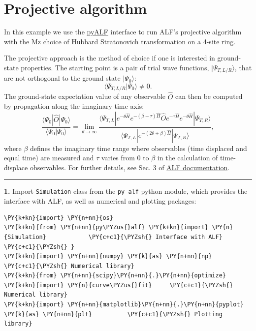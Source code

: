     
    

    
    \hypertarget{projective-algorithm}{%
\section{Projective algorithm}\label{projective-algorithm}}

    In this example we use the
\href{https://git.physik.uni-wuerzburg.de/ALF/pyALF/-/tree/ALF-2.2}{pyALF}
interface to run ALF's projective algorithm with the Mz choice of
Hubbard Stratonovich transformation on a 4-site ring.

The projective approach is the method of choice if one is interested in
ground-state properties. The starting point is a pair of trial wave
functions, \(|\Psi_{T,L/R} \rangle\), that are not orthogonal to the
ground state \(|\Psi_0 \rangle\): \[
  \langle \Psi_{T,L/R}  | \Psi_0 \rangle  \neq 0. 
\] The ground-state expectation value of any observable \(\hat{O}\) can
then be computed by propagation along the imaginary time axis: \[
     \frac{ \langle \Psi_0 | \hat{O} | \Psi_0 \rangle }{ \langle \Psi_0 | \Psi_0 \rangle}   = \lim_{\theta \rightarrow \infty}  
     \frac{ \langle \Psi_{T,L} | e^{-\theta \hat{H}}  e^{-(\beta - \tau)\hat{H}  }\hat{O} e^{- \tau  \hat{H} }   e^{-\theta \hat{H}} | \Psi_{T,R} \rangle } 
            { \langle \Psi_{T,L} | e^{-(2 \theta + \beta) \hat{H}  } | \Psi_{T,R} \rangle } ,
\] where \(\beta\) defines the imaginary time range where observables
(time displaced and equal time) are measured and \(\tau\) varies from
\(0\) to \(\beta\) in the calculation of time-displace observables. For
further details, see Sec. 3 of
\href{https://git.physik.uni-wuerzburg.de/ALF/ALF/-/blob/ALF-2.2/Documentation/doc.pdf}{ALF
documentation}.

\begin{center}\rule{0.5\linewidth}{0.5pt}\end{center}

\textbf{1.} Import \texttt{Simulation} class from the \texttt{py\_alf}
python module, which provides the interface with ALF, as well as
numerical and plotting packages:

    \begin{tcolorbox}[breakable, size=fbox, boxrule=1pt, pad at break*=1mm,colback=cellbackground, colframe=cellborder]
\begin{Verbatim}[commandchars=\\\{\}]
\PY{k+kn}{import} \PY{n+nn}{os}
\PY{k+kn}{from} \PY{n+nn}{py\PYZus{}alf} \PY{k+kn}{import} \PY{n}{Simulation}            \PY{c+c1}{\PYZsh{} Interface with ALF}
\PY{c+c1}{\PYZsh{} }
\PY{k+kn}{import} \PY{n+nn}{numpy} \PY{k}{as} \PY{n+nn}{np}                       \PY{c+c1}{\PYZsh{} Numerical library}
\PY{k+kn}{from} \PY{n+nn}{scipy}\PY{n+nn}{.}\PY{n+nn}{optimize} \PY{k+kn}{import} \PY{n}{curve\PYZus{}fit}     \PY{c+c1}{\PYZsh{} Numerical library}
\PY{k+kn}{import} \PY{n+nn}{matplotlib}\PY{n+nn}{.}\PY{n+nn}{pyplot} \PY{k}{as} \PY{n+nn}{plt}          \PY{c+c1}{\PYZsh{} Plotting library}
\end{Verbatim}
\end{tcolorbox}

